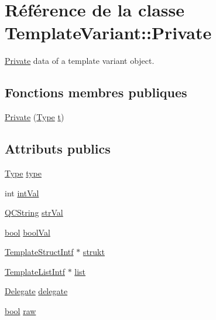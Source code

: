 \hypertarget{class_template_variant_1_1_private}{}\section{Référence de la classe Template\+Variant\+:\+:Private}
\label{class_template_variant_1_1_private}


\hyperlink{class_template_variant_1_1_private}{Private} data of a template variant object.  


\subsection*{Fonctions membres publiques}
\begin{DoxyCompactItemize}
\item 
\hyperlink{class_template_variant_1_1_private_a9167646b33ab5a638a5a1bb6e92dbe23}{Private} (\hyperlink{group__template__api_ga4c0d322ba971480bfbd2a8f418eadc81}{Type} \hyperlink{058__bracket__recursion_8tcl_a69e959f6901827e4d8271aeaa5fba0fc}{t})
\end{DoxyCompactItemize}
\subsection*{Attributs publics}
\begin{DoxyCompactItemize}
\item 
\hyperlink{group__template__api_ga4c0d322ba971480bfbd2a8f418eadc81}{Type} \hyperlink{class_template_variant_1_1_private_af5bb43ca3f5ccc96dd16274b21c2120c}{type}
\item 
int \hyperlink{class_template_variant_1_1_private_aa794b32364b46dd54bfeb2c71b2187c6}{int\+Val}
\item 
\hyperlink{class_q_c_string}{Q\+C\+String} \hyperlink{class_template_variant_1_1_private_ae20be3eccb97ad049dfb639edd72ab07}{str\+Val}
\item 
\hyperlink{qglobal_8h_a1062901a7428fdd9c7f180f5e01ea056}{bool} \hyperlink{class_template_variant_1_1_private_aa40973b71a08351b8c9b1803710ff549}{bool\+Val}
\item 
\hyperlink{class_template_struct_intf}{Template\+Struct\+Intf} $\ast$ \hyperlink{class_template_variant_1_1_private_a554264f12d90a020a51a65919753e818}{strukt}
\item 
\hyperlink{class_template_list_intf}{Template\+List\+Intf} $\ast$ \hyperlink{class_template_variant_1_1_private_a6fbc644fc8a15bca08e37e0b43643166}{list}
\item 
\hyperlink{class_template_variant_1_1_delegate}{Delegate} \hyperlink{class_template_variant_1_1_private_aa39dc0694e2668dda367d6f3cccdebee}{delegate}
\item 
\hyperlink{qglobal_8h_a1062901a7428fdd9c7f180f5e01ea056}{bool} \hyperlink{class_template_variant_1_1_private_abb91eaf0b8f96282716e29b95c418f3f}{raw}
\end{DoxyCompactItemize}


